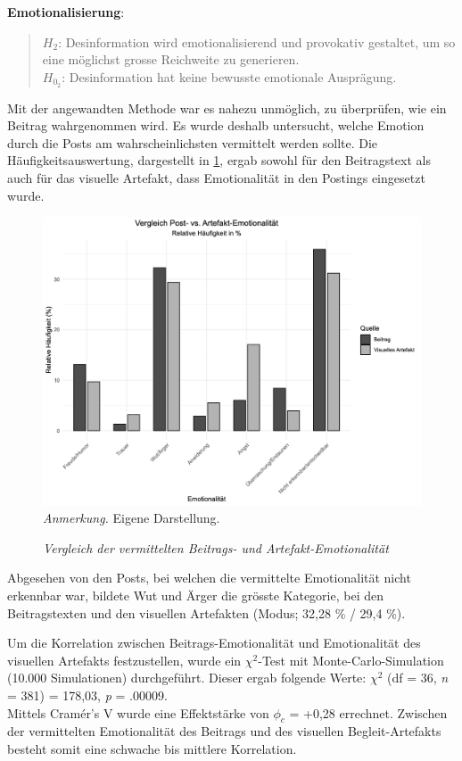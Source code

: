 \documentclass[12pt,a4paper]{article}        %
\begin{document}
\textbf{Emotionalisierung}:
\begin{quote}
  \(H_2\): Desinformation wird emotionalisierend und provokativ gestaltet, um so eine möglichst grosse Reichweite zu generieren.\\
  \(H_{0_2}\): Desinformation hat keine bewusste emotionale Ausprägung.
\end{quote}
Mit der angewandten Methode war es nahezu unmöglich, zu überprüfen, wie ein Beitrag wahrgenommen wird. Es wurde deshalb untersucht, welche Emotion durch die Posts am wahrscheinlichsten vermittelt werden sollte.
Die Häufigkeitsauswertung, dargestellt in \ref{fig:results_sentiment_plot}, ergab sowohl für den Beitragstext als auch für das visuelle Artefakt, dass Emotionalität in den Postings eingesetzt wurde.
\begin{figure}[H]
    \caption{\textit{Vergleich der vermittelten Beitrags- und Artefakt-Emotionalität}}
    \label{fig:results_sentiment_plot}
    \centering
    \includegraphics[width=1\linewidth]{images/sentiment_plot.png}
\footnotesize\textit{Anmerkung.} Eigene Darstellung.
\end{figure}
Abgesehen von den Posts, bei welchen die vermittelte Emotionalität nicht erkennbar war, bildete Wut und Ärger die grösste Kategorie, bei den Beitragstexten und den visuellen Artefakten (Modus; 32,28 \% / 29,4 \%).

Um die Korrelation zwischen Beitrags-Emotionalität und Emotionalität des visuellen Artefakts festzustellen,  wurde ein \(\chi^2\)-Test mit Monte-Carlo-Simulation (10.000 Simulationen) durchgeführt. Dieser ergab folgende Werte: \(\chi^2\) (df = 36, \textit{n} = 381) = 178,03, \textit{p} = .00009.\\
Mittels Cramér's V wurde eine Effektstärke von \(\phi_c\) = +0,28 errechnet. Zwischen der vermittelten Emotionalität des Beitrags und des visuellen Begleit-Artefakts besteht somit eine schwache bis mittlere Korrelation.
\end{document}
